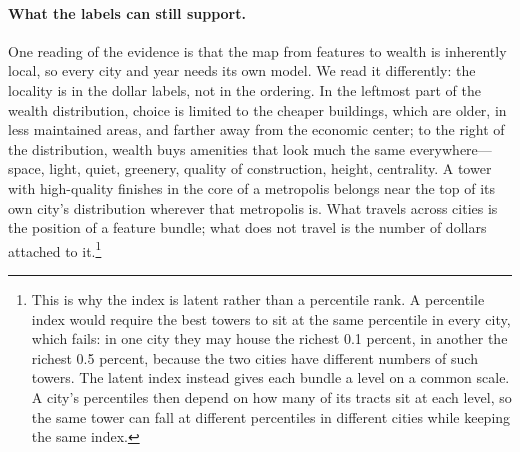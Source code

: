 \documentclass[11pt]{article}
\theoremstyle{remark}
\begin{document}
\paragraph{What the labels can still support.} One reading of the evidence is that the map from features to wealth is inherently local, so every city and year needs its own model. We read it differently: the locality is in the dollar labels, not in the ordering. In the leftmost part of the wealth distribution, choice is limited to the cheaper buildings, which are older, in less maintained areas, and farther away from the economic center; to the right of the distribution, wealth buys amenities that look much the same everywhere---space, light, quiet, greenery, quality of construction, height, centrality. A tower with high-quality finishes in the core of a metropolis belongs near the top of its own city's distribution wherever that metropolis is. What travels across cities is the position of a feature bundle; what does not travel is the number of dollars attached to it.\footnote{This is why the index is latent rather than a percentile rank. A percentile index would require the best towers to sit at the same percentile in every city, which fails: in one city they may house the richest 0.1 percent, in another the richest 0.5 percent, because the two cities have different numbers of such towers. The latent index instead gives each bundle a level on a common scale. A city's percentiles then depend on how many of its tracts sit at each level, so the same tower can fall at different percentiles in different cities while keeping the same index.}
\end{document}
